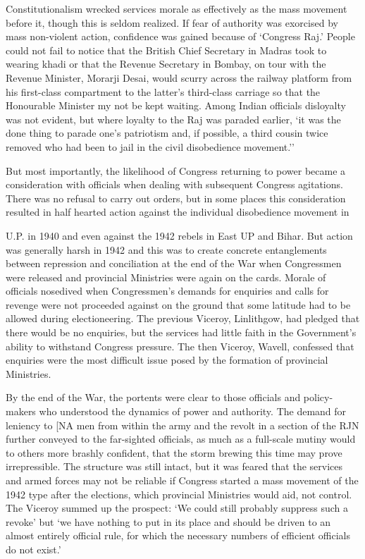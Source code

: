Constitutionalism wrecked services morale as effectively as the mass movement before it, though this is seldom realized. If fear of authority was exorcised by mass non-violent action, confidence was gained because of `Congress Raj.' People could not fail to notice that the British Chief Secretary in Madras took to wearing khadi or that the Revenue Secretary in Bombay, on tour with the Revenue Minister, Morarji Desai, would scurry across the railway platform from his first-class compartment to the latter's third-class carriage so that the Honourable Minister my not be kept waiting. Among Indian officials disloyalty was not evident, but where loyalty to the Raj was paraded earlier, `it was the done thing to parade one's patriotism and, if possible, a third cousin twice removed who had been to jail in the civil disobedience movement.'' 

But most importantly, the likelihood of Congress returning to power became a consideration with officials when dealing with subsequent Congress agitations. There was no refusal to carry out orders, but in some places this consideration resulted in half­ hearted action against the individual disobedience movement in 

U.P. in 1940 and even against the 1942 rebels in East UP and Bihar. But action was generally harsh in 1942 and this was to create concrete entanglements between repression and conciliation at the end of the War when Congressmen were released and provincial Ministries were again on the cards. Morale of officials nosedived when Congressmen's demands for enquiries and calls for revenge were not proceeded against on the ground that some latitude had to be allowed during electioneering. The previous Viceroy, Linlithgow, had pledged that there would be no enquiries, but the services had little faith in the Government's ability to withstand Congress pressure. The then Viceroy, Wavell, confessed that enquiries were the most difficult issue posed by the formation of provincial Ministries. 

By the end of the War, the portents were clear to those officials and policy-makers who understood the dynamics of power and authority. The demand for leniency to [NA men from within the army and the revolt in a section of the RJN further conveyed to the far-sighted officials, as much as a full-scale mutiny would to others more brashly confident, that the storm brewing this time may prove irrepressible. The structure was still intact, but it was feared that the services and armed forces may not be reliable if Congress started a mass movement of the 1942 type after the elections, which provincial Ministries would aid, not control. The Viceroy summed up the prospect: `We could still probably suppress such a revoke' but `we have nothing to put in its place and should be driven to an almost entirely official rule, for which the necessary numbers of efficient officials do not exist.' 

